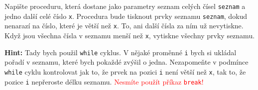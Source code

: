\question[70]
Napište proceduru, která dostane jako parametry seznam celých čísel
\texttt{seznam} a jedno další celé číslo \texttt{x}. Procedura bude tisknout
prvky seznamu \texttt{seznam}, dokud nenarazí na číslo, které je větší než
\texttt{x}. To, ani další čísla za ním už nevytiskne. Když jsou všechna čísla
v seznamu menší než \texttt{x}, vytiskne všechny prvky seznamu.

\textbf{Hint:} Tady bych použil \texttt{while} cyklus. V nějaké proměnné
\texttt{i} bych si
ukládal pořadí v seznamu, které bych pokaždé zvýšil o jedna. Nezapomeňte v
podmínce \texttt{while} cyklu kontrolovat jak to, že prvek na pozici \texttt{i}
není větší než \texttt{x}, tak to, že pozice \texttt{i} nepřeroste délku
seznamu.
\textcolor{red}{Nesmíte použít příkaz \texttt{break}!}